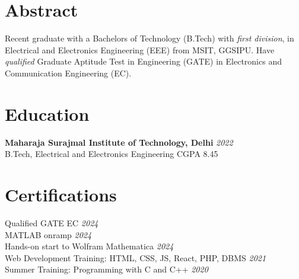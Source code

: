 \documentclass[12pt]{article}
\newcommand{\entry}[5]{{{\textbf{#1}}} \hfill \href{#5}{\faGraduationCap}\textit{#3} \\ {\footnotesize #2 \hfill #4} \\}
\newcommand{\display}[3]{\footnotesize #1 \hfill \href{#2}{\faCertificate}  \textit{#3} \\}
\begin{document}
\begin{paracol}{2}
\switchcolumn


\section{Abstract}
  \footnotesize {Recent graduate with a Bachelors of Technology (B.Tech) with \textit{first division}, in Electrical and Electronics Engineering (EEE) from MSIT, GGSIPU. Have \textit{qualified} Graduate Aptitude Test in Engineering (GATE) in Electronics and Communication Engineering (EC). } 




\section{Education}

  \entry{Maharaja Surajmal Institute of Technology, Delhi}{B.Tech, Electrical and Electronics Engineering}{2022}{CGPA 8.45}{https://drive.google.com/file/d/1-GO2GwWCt-ymG_pjoSAP-UfTh05LxCyu/view?usp=sharing}



\section{Certifications}
\display{Qualified GATE EC}{https://drive.google.com/file/d/1shcvrExVXRHoQDvvzEtomb_LwSz4b1zZ/view?usp=sharing}{2024}
\display{MATLAB onramp}{https://drive.google.com/file/d/1mkDalK8A1keLxXXYWNhQnshTT9sq1vor/view?usp=sharing}{2024}
\display{Hands-on start to Wolfram Mathematica}{https://drive.google.com/file/d/1UMcH0YTn9qbdHo8LIr4tHWEiZi-Xrejt/view?usp=sharing}{2024}
\display{Web Development Training: HTML, CSS, JS, React, PHP, DBMS}{https://drive.google.com/file/d/1BNM1FAxmFkPRrkxTPHEAF5gk_rhXNg5g/view?usp=sharing}{2021}
\display{Summer Training: Programming with C and C++}{https://drive.google.com/file/d/190HRy9cnmwrG0kCt_TeKr5rngykm1PkW/view?usp=sharing}{2020}



\end{paracol}
\end{document}
